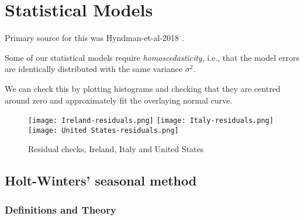 \section{Statistical Models}
\label{ch:statmodel}

Primary source for this was Hyndman-et-al-2018 \cite{Hyndman-et-al-2018}.

Some of our statistical models require \textit{homoscedasticity}, i.e., that the model errors are identically distributed with the same variance $\sigma^2$.

We can check this by plotting histograms and checking that they are centred around zero and approximately fit the overlaying normal curve.

\begin{figure}[H]
  \texttt{[image: Ireland-residuals.png]} \label{fig:ireland-residuals}
\endminipage\hfill
{}
  \texttt{[image: Italy-residuals.png]} \label{fig:italy-residuals}
\endminipage\hfill
{}
  \texttt{[image: United States-residuals.png]} \label{fig:usa-residuals}
\endminipage\hfill
\caption{Residual checks, Ireland, Italy and United States}
\end{figure}

\subsection{Holt-Winters’ seasonal method}

\subsubsection{Definitions and Theory}

